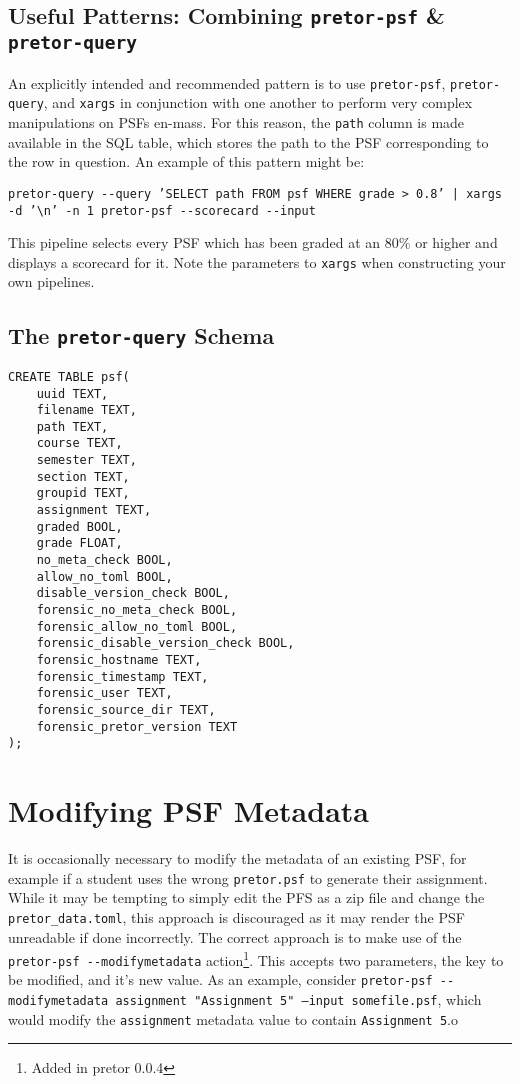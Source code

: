 \documentclass{book}
\begin{document}
\subsection{Useful Patterns: Combining \texttt{pretor-psf} \&
\texttt{pretor-query}}

An explicitly intended and recommended pattern is to use \texttt{pretor-psf},
\texttt{pretor-query}, and \texttt{xargs} in conjunction with one another to
perform very complex manipulations on PSFs en-mass. For this reason, the
\texttt{path} column is made available in the SQL table, which stores the
path to the PSF corresponding to the row in question. An example of this
pattern might be:

\texttt{pretor-query -{}-query 'SELECT path FROM psf WHERE grade > 0.8' | xargs
-d '{\textbackslash}n' -n 1 pretor-psf -{}-scorecard -{}-input}

This pipeline selects every PSF which has been graded at an 80\% or higher and
displays a scorecard for it. Note the parameters to \texttt{xargs} when
constructing your own pipelines.

\subsection{The \texttt{pretor-query} Schema}

\begin{verbatim}
CREATE TABLE psf(
    uuid TEXT,
    filename TEXT,
    path TEXT,
    course TEXT,
    semester TEXT,
    section TEXT,
    groupid TEXT,
    assignment TEXT,
    graded BOOL,
    grade FLOAT,
    no_meta_check BOOL,
    allow_no_toml BOOL,
    disable_version_check BOOL,
    forensic_no_meta_check BOOL,
    forensic_allow_no_toml BOOL,
    forensic_disable_version_check BOOL,
    forensic_hostname TEXT,
    forensic_timestamp TEXT,
    forensic_user TEXT,
    forensic_source_dir TEXT,
    forensic_pretor_version TEXT
);
\end{verbatim}

\section{Modifying PSF Metadata}

It is occasionally necessary to modify the metadata of an existing PSF, for
example if a student uses the wrong \texttt{pretor.psf} to generate their
assignment. While it may be tempting to simply edit the PFS as a zip file and
change the \texttt{pretor\_data.toml}, this approach is discouraged as it may
render the PSF unreadable if done incorrectly. The correct approach is to make
use of the \texttt{pretor-psf -{}-modifymetadata} action\footnote{Added in
pretor 0.0.4}. This accepts two parameters, the key to be modified, and it's
new value. As an example, consider \texttt{pretor-psf -{}-{}modifymetadata
assignment "Assignment 5" --input somefile.psf}, which would modify the
\texttt{assignment} metadata value to contain \texttt{Assignment 5}.o
\end{document}
